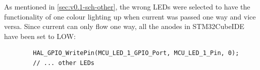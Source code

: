 As mentioned in \autoref{sec:v0.1-sch-other}, the wrong LEDs were selected to have the functionality of one colour lighting up when current was passed one way and vice versa. Since current can only flow one way, all the anodes in STM32CubeIDE have been set to LOW:
\begin{verbatim}
        HAL_GPIO_WritePin(MCU_LED_1_GPIO_Port, MCU_LED_1_Pin, 0);
        // ... other LEDs
\end{verbatim}